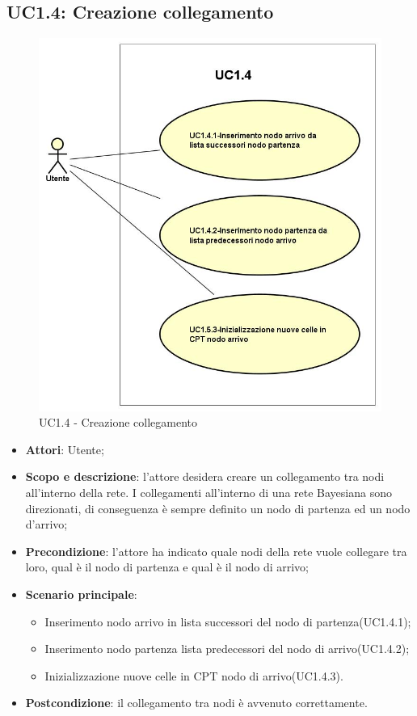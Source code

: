 \subsection{UC1.4: Creazione collegamento} 
\hypertarget{UC1.4}{} 
\begin{figure} [H]
	\centering
	\includegraphics[scale=0.45]{Img/UC1-4} 
	\caption{UC1.4 - Creazione collegamento} \label{} 
\end{figure} 
\begin{itemize} 
	\item{\textbf{Attori}: Utente;} 
	\item{\textbf{Scopo e descrizione}: l'attore desidera creare un collegamento tra nodi all'interno della rete. I collegamenti all'interno di una rete Bayesiana sono direzionati, di conseguenza è sempre definito un nodo di partenza ed un nodo d'arrivo;} 
	\item{\textbf{Precondizione}: l'attore ha indicato quale nodi della rete vuole collegare tra loro, qual è il nodo di partenza e qual è il nodo di arrivo;} 
	\item{\textbf{Scenario principale}: } 
	\begin{itemize} 
		\item{Inserimento nodo arrivo in lista successori del nodo di partenza(UC1.4.1);} 
		\item{Inserimento nodo partenza lista predecessori del nodo di arrivo(UC1.4.2);} 
		\item{Inizializzazione nuove celle in CPT nodo di arrivo(UC1.4.3).} 
	\end{itemize} 
	\item{\textbf{Postcondizione}: il collegamento tra nodi è avvenuto correttamente.} 
\end{itemize} 
